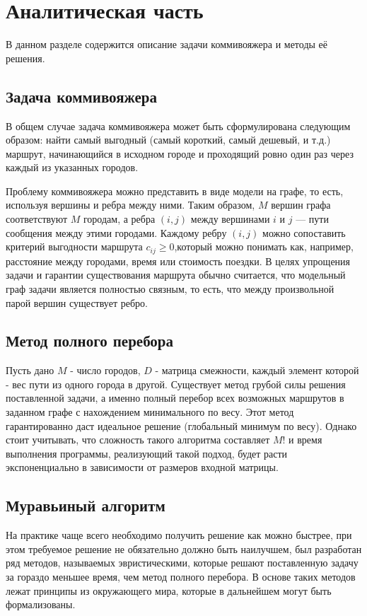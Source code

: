 \chapter{Аналитическая часть}
В данном разделе содержится описание задачи коммивояжера и методы её
решения.


\section{Задача коммивояжера}
В общем случае задача коммивояжера может быть сформулирована следующим образом: найти самый выгодный (самый короткий, самый дешевый, и т.д.) маршрут, начинающийся в исходном городе и проходящий ровно один раз через каждый из указанных городов.

Проблему коммивояжера можно представить в виде модели на графе, то есть, используя вершины и ребра между ними. Таким образом, $M$ вершин графа соответствуют $M$ городам, а ребра $(i, j)$ между вершинами $i$ и $j$ — пути сообщения между этими городами. 
Каждому ребру $(i, j)$ можно сопоставить критерий выгодности маршрута $c_{ij} \geq 0$,который можно понимать как, например, расстояние между городами, время или стоимость поездки.  
В целях упрощения задачи и гарантии существования маршрута обычно считается, что модельный граф задачи является полностью связным, то есть, что между произвольной парой вершин существует ребро.

\section{Метод полного перебора}

Пусть  дано $M$ - число городов, $D$ - матрица смежности, каждый элемент которой - вес пути из одного города в другой. Существует метод грубой силы решения поставленной задачи, а именно полный перебор всех возможных маршрутов в заданном графе с нахождением минимального по весу. Этот метод гарантированно даст идеальное решение (глобальный минимум по весу). Однако стоит учитывать, что сложность такого алгоритма составляет $M!$ и время выполнения программы, реализующий такой подход, будет расти экспоненциально в зависимости от размеров входной матрицы.

\section{Муравьиный алгоритм}

На практике чаще всего необходимо получить решение как можно быстрее, при этом требуемое решение не обязательно должно быть наилучшем, был разработан ряд методов, называемых эвристическими, которые решают поставленную задачу за гораздо меньшее время, чем метод полного перебора.
В основе таких методов лежат принципы из окружающего мира, которые в дальнейшем могут быть формализованы.

